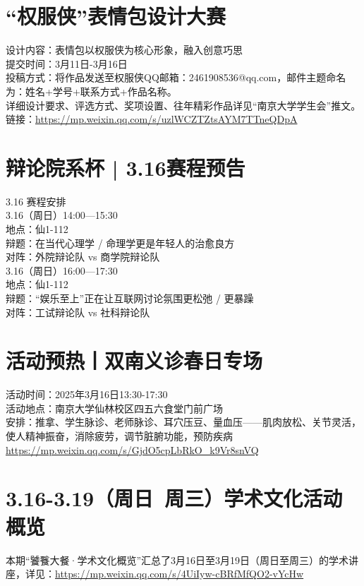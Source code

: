 \documentclass[letterpaper, 12pt]{article}
\begin{document}
\begin{multicols}{2}
\section{“权服侠”表情包设计大赛}
设计内容：表情包以权服侠为核心形象，融入创意巧思\\
提交时间：3月11日-3月16日\\
投稿方式：将作品发送至权服侠QQ邮箱：2461908536@qq.com，邮件主题命名为：姓名+学号+联系方式+作品名称。\\
详细设计要求、评选方式、奖项设置、往年精彩作品详见“南京大学学生会”推文。\\
链接：\url{https://mp.weixin.qq.com/s/uzlWCZTZtsAYM7TTneQDpA}

\section{辩论院系杯 | 3.16赛程预告}
3.16 赛程安排\\
3.16（周日）14:00—15:30\\
地点：仙1-112\\
辩题：在当代心理学 / 命理学更是年轻人的治愈良方\\
对阵：外院辩论队 vs 商学院辩论队\\
3.16（周日）16:00—17:30\\
地点：仙1-112\\
辩题：“娱乐至上”正在让互联网讨论氛围更松弛 / 更暴躁\\
对阵：工试辩论队 vs 社科辩论队\\

\section{活动预热丨双南义诊春日专场}
活动时间：2025年3月16日13:30-17:30\\
活动地点：南京大学仙林校区四五六食堂门前广场\\
安排：推拿、学生脉诊、老师脉诊、耳穴压豆、量血压——肌肉放松、关节灵活，使人精神振奋，消除疲劳，调节脏腑功能，预防疾病\\
\url{https://mp.weixin.qq.com/s/GjdO5cpLbRkO_k9Vr8snVQ}


\section{3.16-3.19（周日~周三）学术文化活动概览}
本期“饕餮大餐·学术文化概览”汇总了3月16日至3月19日（周日至周三）的学术讲座，详见：\url{https://mp.weixin.qq.com/s/4UiIyw-cBRfMfQO2-vYcHw}

\end{multicols}
\end{document}
